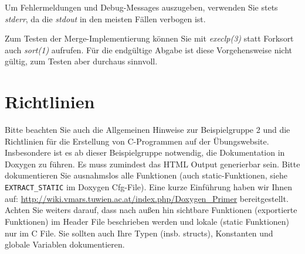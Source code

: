 \documentclass{article}
\begin{document}
Um Fehlermeldungen und Debug-Messages auszugeben, verwenden Sie stets
\emph{stderr}, da die \emph{stdout} in den meisten Fällen verbogen ist.

Zum Testen der Merge-Implementierung können Sie mit \emph{execlp(3)} statt
Forksort auch \emph{sort(1)} aufrufen. Für die endgültige Abgabe ist diese
Vorgehensweise nicht gültig, zum Testen aber durchaus sinnvoll.

\section*{Richtlinien}
Bitte beachten Sie auch die Allgemeinen Hinweise zur Beispielgruppe 2 und die Richtlinien f\"ur die Erstellung von C-Programmen auf der \"Ubungswebsite.
Insbesondere ist es ab dieser Beispielgruppe notwendig, die Dokumentation in Doxygen zu f\"uhren. Es muss zumindest das HTML Output generierbar sein. Bitte dokumentieren Sie ausnahmslos alle Funktionen (auch static-Funktionen, siehe \verb|EXTRACT_STATIC| im Doxygen Cfg-File). Eine kurze Einf\"uhrung haben wir Ihnen auf: \url{http://wiki.vmars.tuwien.ac.at/index.php/Doxygen_Primer} bereitgestellt. Achten Sie weiters darauf, dass nach au{\ss}en hin sichtbare Funktionen (exportierte Funktionen) im Header File beschrieben werden und lokale (static Funktionen) nur im C File. Sie sollten auch Ihre Typen (insb. structs), Konstanten und globale Variablen dokumentieren. 
\end{document}
